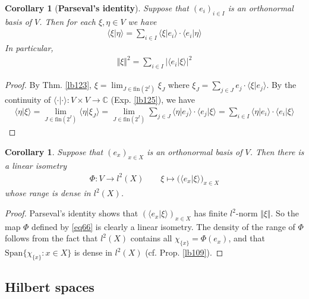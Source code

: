 \documentclass[12pt,b5paper,notitlepage]{article}
\theoremstyle{definition}
\theoremstyle{plain}
\newtheorem{co}[df]{Corollary}
\newcommand{\Span}{\mathrm{Span}}
\newcommand{\bk}[1]{\langle {#1}\rangle}
\newcommand{\Cbb}{\mathbb C}
\newcommand{\fin}{\mathrm{fin}}
\numberwithin{equation}{section}
\begin{document}
\begin{co}[\textbf{Parseval's identity}]\label{lb601}
Suppose that $(e_i)_{i\in I}$ is an orthonormal basis of $V$. Then for each $\xi,\eta\in V$ we have
\begin{align}\label{eq246}
\bk{\xi|\eta}=\sum_{i\in I}\bk{\xi|e_i}\cdot\bk{e_i|\eta}
\end{align}
In particular,
\begin{align}
\Vert \xi\Vert^2=\sum_{i\in I}|\bk{e_i|\xi}|^2
\end{align}
\end{co}

\begin{proof}
By Thm. \ref{lb123}, $\xi=\lim_{J\in\fin(2^I)}\xi_J$ where $\xi_J=\sum_{j\in J}e_j\cdot\bk{\xi|e_j}$. By the continuity of $\bk{\cdot|\cdot}:V\times V\rightarrow\Cbb$ (Exp. \ref{lb125}), we have
\begin{align*}
\bk{\eta|\xi}=\lim_{J\in\fin(2^I)}\bk{\eta|\xi_J}=\lim_{J\in\fin(2^I)}\sum_{j\in J}\bk{\eta|e_j}\cdot\bk{e_j|\xi}=\sum_{i\in I}\bk{\eta|e_i}\cdot\bk{e_i|\xi}
\end{align*}
\end{proof}



\begin{co}\label{lb126}
Suppose that $(e_x)_{x\in X}$ is an orthonormal basis of $V$. Then there is a linear isometry
\begin{gather}\label{eq66}
\Phi:V\rightarrow l^2(X)\qquad \xi\mapsto \big(\bk{e_x|\xi})_{x\in X}
\end{gather} 
whose range is dense in $l^2(X)$.
\end{co}




\begin{proof}
Parseval's identity shows that $(\bk{e_x|\xi})_{x\in X}$ has finite $l^2$-norm $\Vert \xi\Vert$. So the map $\Phi$ defined by \eqref{eq66} is clearly a linear isometry. The density of the range of $\Phi$ follows from the fact that $l^2(X)$ contains all $\chi_{\{x\}}=\Phi(e_x)$, and that $\Span\{\chi_{\{x\}}:x\in X\}$ is dense in $l^2(X)$ (cf. Prop. \ref{lb109}).
\end{proof}




\subsection{Hilbert spaces}
\end{document}
